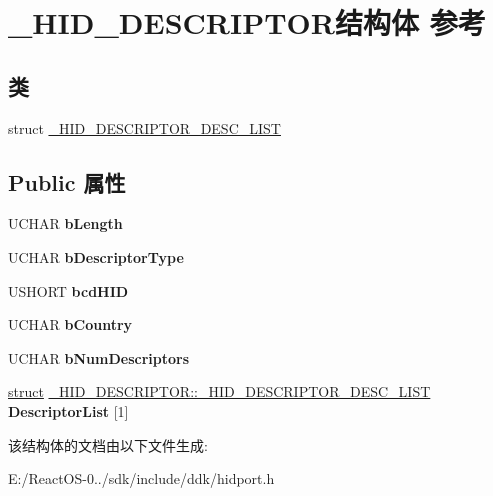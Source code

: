 \hypertarget{struct___h_i_d___d_e_s_c_r_i_p_t_o_r}{}\section{\+\_\+\+H\+I\+D\+\_\+\+D\+E\+S\+C\+R\+I\+P\+T\+O\+R结构体 参考}
\label{struct___h_i_d___d_e_s_c_r_i_p_t_o_r}
\subsection*{类}
\begin{DoxyCompactItemize}
\item 
struct \hyperlink{struct___h_i_d___d_e_s_c_r_i_p_t_o_r_1_1___h_i_d___d_e_s_c_r_i_p_t_o_r___d_e_s_c___l_i_s_t}{\+\_\+\+H\+I\+D\+\_\+\+D\+E\+S\+C\+R\+I\+P\+T\+O\+R\+\_\+\+D\+E\+S\+C\+\_\+\+L\+I\+ST}
\end{DoxyCompactItemize}
\subsection*{Public 属性}
\begin{DoxyCompactItemize}
\item 
\mbox{\label{struct___h_i_d___d_e_s_c_r_i_p_t_o_r_a8f218c91b085e03226f740b5758ad0c6}} 
U\+C\+H\+AR {\bfseries b\+Length}
\item 
\mbox{\label{struct___h_i_d___d_e_s_c_r_i_p_t_o_r_a4dfaa36a24a78b4a79c1c3acc01c9463}} 
U\+C\+H\+AR {\bfseries b\+Descriptor\+Type}
\item 
\mbox{\label{struct___h_i_d___d_e_s_c_r_i_p_t_o_r_a93c947cb917d5ebfa28f7f1212d4bd43}} 
U\+S\+H\+O\+RT {\bfseries bcd\+H\+ID}
\item 
\mbox{\label{struct___h_i_d___d_e_s_c_r_i_p_t_o_r_a0ad228368646885763f9b7d1f8b46658}} 
U\+C\+H\+AR {\bfseries b\+Country}
\item 
\mbox{\label{struct___h_i_d___d_e_s_c_r_i_p_t_o_r_a18a303cc1db3c819a0ad7210892676a9}} 
U\+C\+H\+AR {\bfseries b\+Num\+Descriptors}
\item 
\mbox{\label{struct___h_i_d___d_e_s_c_r_i_p_t_o_r_a2d087a27241ffaaa855b9bda3218879d}} 
\hyperlink{interfacestruct}{struct} \hyperlink{struct___h_i_d___d_e_s_c_r_i_p_t_o_r_1_1___h_i_d___d_e_s_c_r_i_p_t_o_r___d_e_s_c___l_i_s_t}{\+\_\+\+H\+I\+D\+\_\+\+D\+E\+S\+C\+R\+I\+P\+T\+O\+R\+::\+\_\+\+H\+I\+D\+\_\+\+D\+E\+S\+C\+R\+I\+P\+T\+O\+R\+\_\+\+D\+E\+S\+C\+\_\+\+L\+I\+ST} {\bfseries Descriptor\+List} \mbox{[}1\mbox{]}
\end{DoxyCompactItemize}


该结构体的文档由以下文件生成\+:\begin{DoxyCompactItemize}
\item 
E\+:/\+React\+O\+S-\/0../sdk/include/ddk/hidport.\+h\end{DoxyCompactItemize}

